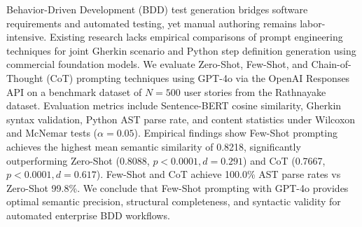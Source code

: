 Behavior-Driven Development (BDD) test generation bridges software requirements and automated testing, yet manual authoring remains labor-intensive. Existing research lacks empirical comparisons of prompt engineering techniques for joint Gherkin scenario and Python step definition generation using commercial foundation models. We evaluate Zero-Shot, Few-Shot, and Chain-of-Thought (CoT) prompting techniques using GPT-4o via the OpenAI Responses API on a benchmark dataset of $N=500$ user stories from the Rathnayake dataset. Evaluation metrics include Sentence-BERT cosine similarity, Gherkin syntax validation, Python AST parse rate, and content statistics under Wilcoxon and McNemar tests ($\alpha=0.05$). Empirical findings show Few-Shot prompting achieves the highest mean semantic similarity of 0.8218, significantly outperforming Zero-Shot (0.8088, $p < 0.0001, d=0.291$) and CoT (0.7667, $p < 0.0001, d=0.617$). Few-Shot and CoT achieve 100.0\% AST parse rates vs Zero-Shot 99.8\%. We conclude that Few-Shot prompting with GPT-4o provides optimal semantic precision, structural completeness, and syntactic validity for automated enterprise BDD workflows.
